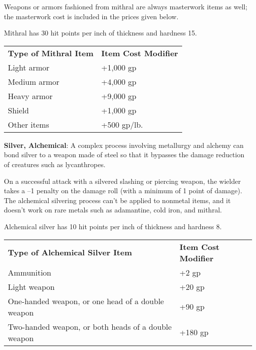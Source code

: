 Weapons or armors fashioned from mithral are always masterwork items as well; the masterwork cost is included in the prices given below.
	
Mithral has 30 hit points per inch of thickness and hardness 15.
			
\begin{table}
\sffamily
 \begin{tabular}{ll}
\textbf{Type of Mithral Item} & \textbf{Item Cost Modifier}\\
Light armor & +1,000 gp\\
Medium armor & +4,000 gp\\
Heavy armor & +9,000 gp\\
Shield & +1,000 gp\\
Other items & +500 gp/lb.\\
 \end{tabular}
\end{table}
		
\textbf{Silver, Alchemical}: A complex process involving metallurgy and alchemy can bond silver to a weapon made of steel so that it bypasses the damage reduction of creatures such as lycanthropes.
	
On a successful attack with a silvered slashing or piercing weapon, the wielder takes a --1 penalty on the damage roll (with a minimum of 1 point of damage). The alchemical silvering process can't be applied to nonmetal items, and it doesn't work on rare metals such as adamantine, cold iron, and mithral.
	
Alchemical silver has 10 hit points per inch of thickness and hardness 8.
			
\begin{table}
 \sffamily
 \begin{tabularx}{\linewidth}{Xl}
  \textbf{Type of Alchemical Silver Item} & \textbf{Item Cost Modifier} \\
  Ammunition & +2 gp\\
  Light weapon & +20 gp\\
  One-handed weapon, or one head of a double weapon & +90 gp \\
  Two-handed weapon, or both heads of a double weapon & +180 gp 
 \end{tabularx}
\end{table}
	
